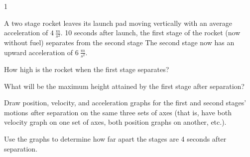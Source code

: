 
\AddToShipoutPicture*{\BackgroundPic}

\addtocounter {ProbNum} {1}

 
{\bf \Large{}} A two stage rocket leaves its launch pad moving vertically with an average acceleration of ${4~\tfrac{m}{s^2}}$.  10 seconds after launch, the first stage of the rocket (now without fuel) separates from the second stage  The second stage now has an upward acceleration of ${6~\tfrac{m}{s^2}}$.  

\bigskip
How high is the rocket when the first stage separates?

\vfill

What will be the maximum height attained by the first stage after separation?

\vfill

\newpage 
\AddToShipoutPicture*{\BackgroundPic}
Draw position, velocity, and acceleration graphs for the first and second stages' motions {\emph after separation} on the same three sets of axes (that is, have both velocity graph on one set of axes, both position graphs on another, etc.).

\vfill

\vfill

Use the graphs to determine how far apart the stages are 4 seconds after separation.

\vfill
\newpage

